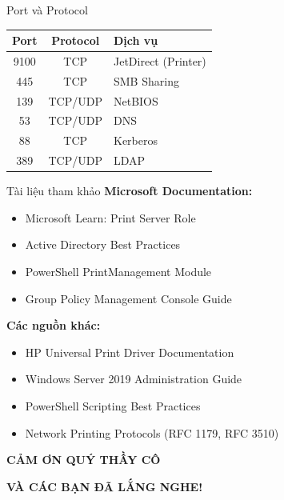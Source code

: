 \documentclass{beamer}
\begin{document}
    \begin{frame}{Port và Protocol}
        \begin{table}[ht]
            \centering
            \small
            \begin{tabular}{|c|c|l|}
            \hline
            \textbf{Port} & \textbf{Protocol} & \textbf{Dịch vụ} \\
            \hline
            9100 & TCP & JetDirect (Printer) \\
            \hline
            445 & TCP & SMB Sharing \\
            \hline
            139 & TCP/UDP & NetBIOS \\
            \hline
            53 & TCP/UDP & DNS \\
            \hline
            88 & TCP & Kerberos \\
            \hline
            389 & TCP/UDP & LDAP \\
            \hline
            \end{tabular}
        \end{table}
        
        \vspace{0.3cm}
    \end{frame}

    \begin{frame}{Tài liệu tham khảo}
        \textbf{Microsoft Documentation:}
        \begin{itemize}
            \item Microsoft Learn: Print Server Role
            \item Active Directory Best Practices
            \item PowerShell PrintManagement Module
            \item Group Policy Management Console Guide
        \end{itemize}
        
        \vspace{0.3cm}
        \textbf{Các nguồn khác:}
        \begin{itemize}
            \item HP Universal Print Driver Documentation
            \item Windows Server 2019 Administration Guide
            \item PowerShell Scripting Best Practices
            \item Network Printing Protocols (RFC 1179, RFC 3510)
        \end{itemize}
    \end{frame}

    \begin{frame}
        \begin{center}
            {\Huge \textbf{CẢM ƠN QUÝ THẦY CÔ}}
            
            \vspace{1cm}
            {\Large \textbf{VÀ CÁC BẠN ĐÃ LẮNG NGHE!}}
            
        \end{center}
    \end{frame}
\end{document}
